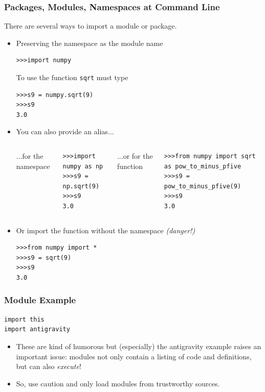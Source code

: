 \documentclass{beamer}
\begin{document}
\begin{frame}[fragile]
\frametitle{Packages, Modules, Namespaces at Command Line}
There are several ways to import a module or package.
\begin{itemize}
\pause
\item Preserving the namespace as the module name
\begin{lstlisting}
>>>import numpy
\end{lstlisting}
To use the function \texttt{sqrt} must type
\begin{lstlisting}
>>>s9 = numpy.sqrt(9)
>>>s9
3.0
\end{lstlisting}
\pause
\item {You can also provide an alias...}
\begin{columns}[c]
\column{3.5cm}
...for the namespace
\begin{lstlisting}
>>>import numpy as np
>>>s9 = np.sqrt(9)
>>>s9
3.0
\end{lstlisting}
\column{4.5cm}
...or for the function
\begin{lstlisting}
>>>from numpy import sqrt as pow_to_minus_pfive
>>>s9 = pow_to_minus_pfive(9)
>>>s9
3.0
\end{lstlisting}
\end{columns}
\pause
\item Or import the function without the namespace \emph{(danger!)}
\begin{lstlisting}
>>>from numpy import *
>>>s9 = sqrt(9)
>>>s9
3.0

\end{lstlisting}
\end{itemize}
\end{frame}

\begin{frame}[fragile]
\frametitle{Module Example}

\begin{lstlisting}
import this
import antigravity
\end{lstlisting}
\pause
\begin{itemize}

\item These are kind of humorous but (especially) the antigravity example raises an important issue: \newline{}
modules not only contain a listing of code and definitions, but can also \emph{execute}!

\item So, use caution and only load modules from trustworthy sources.
\end{itemize}

\end{frame}
\end{document}
